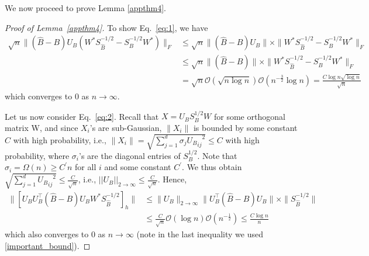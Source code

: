 We now proceed to prove Lemma \ref{appthm4}.
\begin{proof}[Proof of Lemma~\ref{appthm4}]
  To show Eq.~\eqref{eq:1}, we have
  \begin{align*}
    \sqrt{n} \| (\hat{B} -B) U_B (W^{*} S_{\hat{B}}^{-1/2} - S_B^{-1/2} W^{*}) \|_F 
    & \leq \sqrt{n} \| (\hat{B} -B) U_B \| \times \| W^{*} S_{\hat{B}}^{-1/2} - S_B^{-1/2} W^{*} \|_F \\
    &  \leq  \sqrt{n} \| (\hat{B} -B) \| \times \| W^{*} S_{\hat{B}}^{-1/2} - S_B^{-1/2} W^{*} \|_F \\
    & = \sqrt{n} \mathcal{O}(\sqrt{n \log n}) \mathcal{O}(n^{-\frac{3}{2}} \log n) = \frac{C \log n \sqrt{\log n}}{\sqrt{n}}
  \end{align*}
which converges to $0$ as $n \rightarrow \infty$.

Let us now consider Eq.~\eqref{eq:2}. Recall that $X = U_B S_B^{1/2} W$ for some orthogonal matrix W, and since $X_i$'s are sub-Gaussian, $\|X_i\|$ is bounded by some constant $C$ with high probability, i.e., $\|X_i\| = \sqrt{\sum\limits_{j=1}^d \sigma_j {{U_B}_{ij}}^2} \leq C$ with high probability, where $\sigma_i$'s are the diagonal entries of $S_B^{1/2}$. Note that 
$\sigma_i = \Omega(n) \geq C^{'}n$ for all $i$ and some constant $C^{'}$. We thus obtain
$\sqrt{\sum_{j = 1}^{d} {{U_B}_{ij}}^2} \leq \frac{C}{\sqrt{n}}$,  i.e., $||U_B||_{2 {\to} \infty} \leq \frac{C}{\sqrt{n}}.$
Hence, 
\begin{equation*}
\begin{split}
\| [ U_B U_B^{\top} (\hat{B} - B) U_B W^{*} S_{\hat{B}}^{-1/2}]_{h} \| & \leq \|U_B\|_{2 {\to} \infty} \| U_B^{\top} (\hat{B} - B) U_B \| \times \|S_{\hat{B}}^{-1/2}\| \\
& \leq \frac{C}{\sqrt{n}} \mathcal{O}( \log n) \mathcal{O}(n^{-\frac{1}{2}} ) \leq \frac{C \log n}{n} 
\end{split}
\end{equation*}
which also converges to $0$ as $n \rightarrow \infty$ (note in the last inequality we used \ref{important_bound}).
  

\end{proof}
